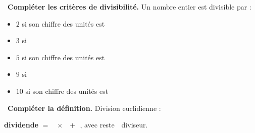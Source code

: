 \documentclass[a4paper,11pt]{article}
\newcommand{\bl}[1][4cm]{\,\makebox[#1]{\dotfill}\,}
\newcommand{\coeur}{\textcolor{Couleur8}{\faHeart}\ }
\begin{document}
\noindent \coeur \textbf{Compl\'eter les crit\`eres de divisibilit\'e.} Un nombre entier est divisible par :
\begin{mdframed}[linecolor=Couleur1,linewidth=4pt,topline=false,bottomline=false,rightline=false,backgroundcolor=Couleur1!5,innerleftmargin=8pt,innertopmargin=6pt,innerbottommargin=6pt]
\begin{itemize}[label=\textcolor{Couleur1}{$\bullet$},nosep,itemsep=3pt]
\item $2$ si son chiffre des unit\'es est \bl[4cm]
\item $3$ si \bl[7cm]
\item $5$ si son chiffre des unit\'es est \bl[2cm]
\item $9$ si \bl[7cm]
\item $10$ si son chiffre des unit\'es est \bl[1.5cm]
\end{itemize}
\end{mdframed}

\noindent \coeur \textbf{Compl\'eter la d\'efinition.} Division euclidienne :
\begin{mdframed}[linecolor=Couleur6,linewidth=4pt,topline=false,bottomline=false,rightline=false,backgroundcolor=Couleur6!10,innerleftmargin=8pt,innertopmargin=6pt,innerbottommargin=6pt]
\textbf{dividende} $=$ \bl[3cm] $\times$ \bl[3cm] $+$ \bl[3cm], avec reste \bl[2cm] diviseur.
\end{mdframed}
\end{document}
